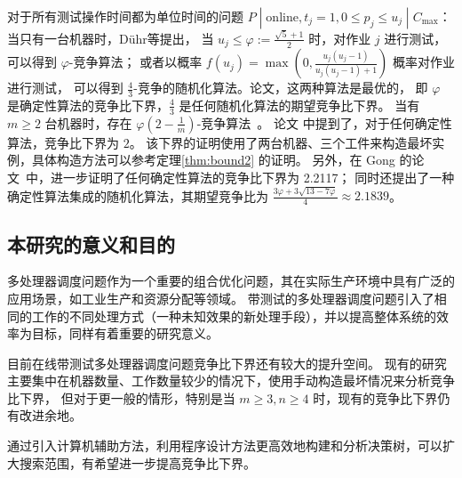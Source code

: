 对于所有测试操作时间都为单位时间的问题 $P\;|\;\text{online}, t_j=1,0\leq p_j \leq u_j\;|\; C_{\text{max}}$：
当只有一台机器时，Dühr等\cite{durr2018scheduling}\cite{durr2020adversarial}提出，
当 $u_j \leq \varphi := \frac{\sqrt{5}+1}{2}$ 时，对作业 $j$ 进行测试，可以得到 $\varphi$-竞争算法；
或者以概率 $f(u_j) = \max \left(0, \frac{u_j(u_j-1)}{u_j(u_j-1)+1}\right)$ 概率对作业进行测试，
可以得到 $\frac43$-竞争的随机化算法。论文\cite{albers2021explorable}，这两种算法是最优的，
即 $\varphi$ 是确定性算法的竞争比下界，$\frac43$ 是任何随机化算法的期望竞争比下界。
当有 $m\geq 2$ 台机器时，存在 $\varphi(2-\frac1m)$-竞争算法~\cite{graham1966bounds}。
论文\cite{albers2021scheduling} 中提到了，对于任何确定性算法，竞争比下界为 $2$。
该下界的证明使用了两台机器、三个工件来构造最坏实例，具体构造方法可以参考定理\ref{thm:bound2} 的证明。
另外，在 Gong 的论文~\cite{gong2023randomized}中，进一步证明了任何确定性算法的竞争比下界为 2.2117；
同时还提出了一种确定性算法集成的随机化算法，其期望竞争比为 $\frac{3\varphi+3\sqrt{13-7\varphi}}{4}\approx 2.1839$。    

    
\subsection{本研究的意义和目的}

多处理器调度问题作为一个重要的组合优化问题，其在实际生产环境中具有广泛的应用场景，如工业生产和资源分配等领域。
带测试的多处理器调度问题引入了相同的工作的不同处理方式（一种未知效果的新处理手段），并以提高整体系统的效率为目标，同样有着重要的研究意义。

目前在线带测试多处理器调度问题竞争比下界还有较大的提升空间。
现有的研究主要集中在机器数量、工作数量较少的情况下，使用手动构造最坏情况来分析竞争比下界，
但对于更一般的情形，特别是当 $m \geq 3, n\geq 4$ 时，现有的竞争比下界仍有改进余地。

通过引入计算机辅助方法，利用程序设计方法更高效地构建和分析决策树，可以扩大搜索范围，有希望进一步提高竞争比下界。